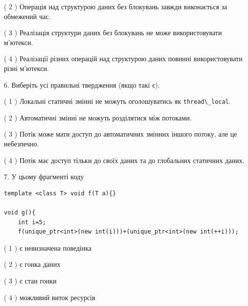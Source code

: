 \documentclass[12pt, ukrainian]{article}
\def\code#1{\Verb!#1!}
\begin{document}
\begin {large}
{( 2 ) Операція над структурою даних без блокувань завжди виконається за обмежений час.%

( 3 ) Реалізація структури даних без блокувань не може використовувати м’ютекси.%

( 4 ) Реалізації різних операцій над структурою даних повинні використовувати різні м’ютекси.%
\newpage



\vspace{5mm}
6. Виберіть усі правильні твердження (якщо такі є).\par
\vspace{2mm}

( 1 ) Локальні статичні змінні не можуть оголошуватись як \code{thread\_local}.%

( 2 ) Автоматичні змінні не можуть розділятися між потоками.%

( 3 ) Потік може мати доступ до автоматичних змінних іншого потоку, але це небезпечно.%

( 4 ) Потік має доступ тільки до своїх даних та до глобальних статичних даних.%


\vspace{5mm}
7. У цьому фрагменті коду
\begin{verbatim}
template <class T> void f(T a){}

void g(){
    int i=5;
    f(unique_ptr<int>(new int(i)))+(unique_ptr<int>(new int(++i)));
\end{verbatim}
( 1 ) є невизначена поведінка%

( 2 ) є гонка даних%

( 3 ) є стан гонки%

( 4 ) можливий виток ресурсів%
}
\end {large}
\end{document}
